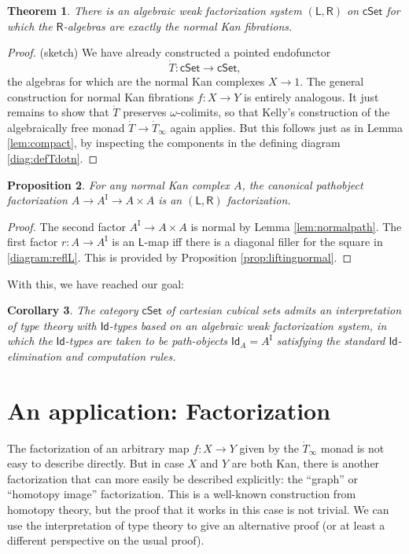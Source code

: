 \documentclass[12pt]{article}
\newcommand{\cSet}{\ensuremath{\mathsf{cSet}}}
\newcommand{\LL}{\ensuremath{\mathsf{L}}}
\newcommand{\RR}{\ensuremath{\mathsf{R}}}
\newcommand{\I}{\ensuremath{\mathrm{I}}}
\newcommand{\Id}{\ensuremath{\mathsf{Id}}}
\newcommand{\id}[1]{\Id_{#1}}
\newtheorem{theorem}{Theorem}
\newtheorem{proposition}[theorem]{Proposition}
\newtheorem{corollary}[theorem]{Corollary}
\theoremstyle{remark}
\theoremstyle{definition}
\begin{document}
\begin{theorem}\label{thm:AWFS2}
There is an algebraic weak factorization system $(\LL,\RR)$ on $\cSet$ for which the $\RR$-algebras are exactly the normal Kan fibrations. \end{theorem}

\begin{proof}(sketch)
We have already constructed a pointed endofunctor $$\dot{T} :\cSet\to\cSet,$$ the algebras for which are the normal Kan complexes $X\to 1$.   The general construction for normal Kan fibrations $f:X\to Y$ is entirely analogous.  It just remains to show that $\dot{T}$ preserves $\omega$-colimits, so that Kelly's construction of the algebraically free monad $\dot{T}\to \dot{T}_\infty$ again applies. But this follows just as in Lemma \ref{lem:compact}, by inspecting the components in the defining diagram \eqref{diag:defTdotn}.
\end{proof}

\begin{proposition}
For any normal Kan complex $A$, the canonical pathobject factorization $A\to A^\I\to A\times A$ is an $(\LL,\RR)$ factorization.
\end{proposition}

\begin{proof}
The second factor $A^\I\to A\times A$ is normal by Lemma \ref{lem:normalpath}. The first factor $r:A\to A^\I$ is an $\LL$-map iff there is a diagonal filler for the square in \eqref{diagram:reflL}.  This is provided by Proposition \ref{prop:liftingnormal}.
\end{proof}

With this, we have reached our goal: 
\begin{corollary}
The category $\cSet$ of cartesian cubical sets admits an interpretation of type theory with \Id-types based on an algebraic weak factorization system, in which the \Id-types are taken to be path-objects $\id{A} = A^\I$ satisfying the standard \Id-elimination and computation rules.  
\end{corollary}

\section{An application: Factorization}

The factorization of an arbitrary map $f:X\to Y$ given by the $\dot{T}_\infty$ monad is not easy to describe directly.  But in case $X$ and $Y$ are both Kan, there is another factorization that can more easily be described explicitly: the ``graph'' or ``homotopy image'' factorization. This is a well-known construction from homotopy theory, but the proof that it works in this case is not trivial.  We can use the interpretation of type theory to give an alternative proof (or at least a different perspective on the usual proof).
\end{document}
